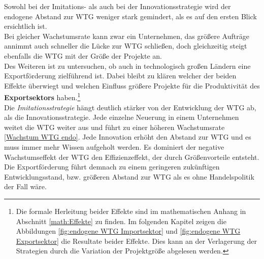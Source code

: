 Sowohl bei der Imitations- als auch bei der Innovationsstrategie wird der endogene Abstand zur WTG weniger stark gemindert, als es auf den ersten Blick ersichtlich ist.\\


Bei gleicher Wachstumsrate kann zwar ein Unternehmen, das grö{\ss}ere Aufträge annimmt auch schneller die Lücke zur WTG schlie{\ss}en, doch gleichzeitig steigt ebenfalls die WTG mit der Grö{\ss}e der Projekte an.\\


Des Weiteren ist zu untersuchen, ob auch in technologisch gro{\ss}en Ländern eine Exportförderung zielführend ist. Dabei bleibt zu klären welcher der beiden Effekte überwiegt und welchen Einfluss grö{\ss}ere Projekte für die Produktivität des \textbf{Exportsektors} haben.\footnote{Die formale Herleitung beider Effekte sind im mathematischen Anhang in Abschnitt \ref{math:Effekte} zu finden. Im folgenden Kapitel zeigen die Abbildungen \ref{fig:endogene WTG Importsektor} und \ref{fig:endogene WTG Exportsektor} die Resultate beider Effekte. Dies kann an der Verlagerung der Strategien durch die Variation der Projektgrö{\ss}e abgelesen werden.}\\


Die \textit{Imitationsstrategie} hängt deutlich stärker von der Entwicklung der WTG ab, als die Innovationsstrategie. Jede einzelne Neuerung in einem Unternehmen weitet die WTG weiter aus und führt zu einer höheren Wachstumsrate \eqref{Wachstum WTG endo}. Jede Innovation erhöht den Abstand zur WTG und es muss immer mehr Wissen aufgeholt werden. Es dominiert der negative Wachstumseffekt der WTG den Effizienzeffekt, der durch Grö{\ss}envorteile entsteht. Die Exportförderung führt demnach zu einem geringeren zukünftigen Entwicklungsstand, bzw. grö{\ss}eren Abstand zur WTG als es ohne Handelspolitik der Fall wäre.\\


